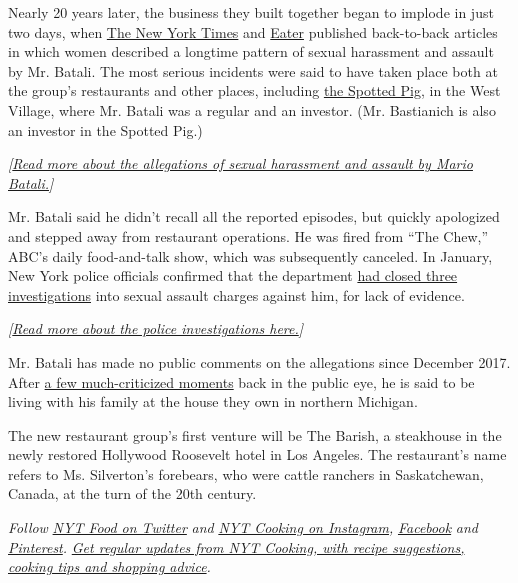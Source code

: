 Nearly 20 years later, the business they built together began to implode
in just two days, when
\href{https://www.nytimes.com/2017/12/12/dining/ken-friedman-sexual-harassment.html}{The
New York Times} and
\href{https://ny.eater.com/2017/12/11/16759540/mario-batali-sexual-misconduct-allegations}{Eater}
published back-to-back articles in which women described a longtime
pattern of sexual harassment and assault by Mr. Batali. The most serious
incidents were said to have taken place both at the group's restaurants
and other places, including
\href{https://www.nytimes.com/2018/08/20/dining/mario-batali-spotted-pig.html}{the
Spotted Pig}, in the West Village, where Mr. Batali was a regular and an
investor. (Mr. Bastianich is also an investor in the Spotted Pig.)

\emph{{[}}\href{https://www.nytimes.com/2017/12/12/dining/ken-friedman-sexual-harassment.html}{\emph{Read
more about the allegations of sexual harassment and assault by Mario
Batali.}}\emph{{]}}

Mr. Batali said he didn't recall all the reported episodes, but quickly
apologized and stepped away from restaurant operations. He was fired
from ``The Chew,'' ABC's daily food-and-talk show, which was
subsequently canceled. In January, New York police officials confirmed
that the department
\href{https://www.nytimes.com/2019/01/08/dining/mario-batali-sexual-assault-no-charges-nypd.html}{had
closed three investigations} into sexual assault charges against him,
for lack of evidence.

\emph{{[}}\href{https://www.nytimes.com/2019/01/08/dining/mario-batali-sexual-assault-no-charges-nypd.html}{\emph{Read
more about the police investigations here.}}\emph{{]}}

Mr. Batali has made no public comments on the allegations since December
2017. After
\href{https://www.nytimes.com/2018/04/02/dining/mario-batali-sexual-harassment.html}{a
few much-criticized moments} back in the public eye, he is said to be
living with his family at the house they own in northern Michigan.

The new restaurant group's first venture will be The Barish, a
steakhouse in the newly restored Hollywood Roosevelt hotel in Los
Angeles. The restaurant's name refers to Ms. Silverton's forebears, who
were cattle ranchers in Saskatchewan, Canada, at the turn of the 20th
century.

\emph{Follow} \href{https://twitter.com/nytfood}{\emph{NYT Food on
Twitter}} \emph{and}
\href{https://www.instagram.com/nytcooking/}{\emph{NYT Cooking on
Instagram}}\emph{,}
\href{https://www.facebook.com/nytcooking/}{\emph{Facebook}} \emph{and}
\href{https://www.pinterest.com/nytcooking/}{\emph{Pinterest}}\emph{.}
\href{https://www.nytimes.com/newsletters/cooking}{\emph{Get regular
updates from NYT Cooking, with recipe suggestions, cooking tips and
shopping advice}}\emph{.}

